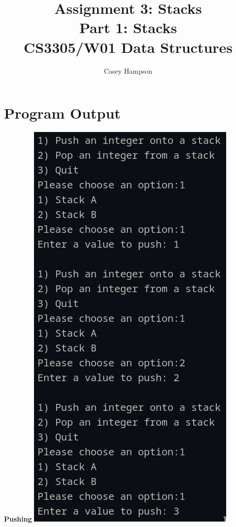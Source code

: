\documentclass{article}
\title{Assignment 3: Stacks \\[5pt] Part 1: Stacks \\[8pt] CS3305/W01 Data Structures}
\author{Casey Hampson}
\begin{document}
\maketitle


\section*{Program Output}
\begin{multicols}{2}
    \begin{center}
        \Large\textbf{Pushing}
        \includegraphics[width=0.8\linewidth]{./res/1a.png}
    \end{center}
    \vfill


\end{multicols}
\end{document}
